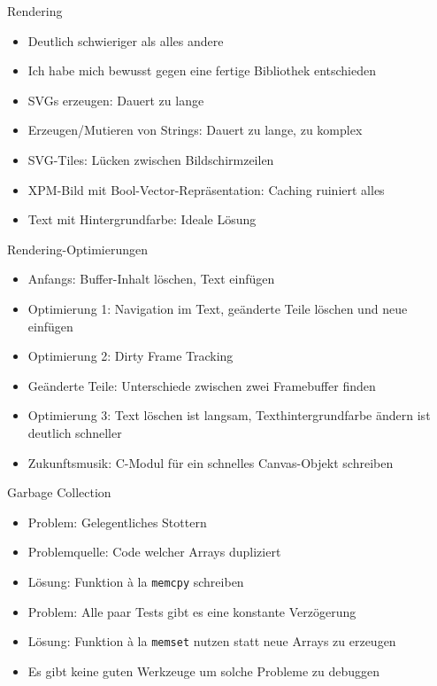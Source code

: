 \documentclass[presentation]{beamer}
\begin{document}
\begin{frame}[label={sec:org3d595c6}]{Rendering}
\begin{itemize}
\item Deutlich schwieriger als alles andere
\item Ich habe mich bewusst gegen eine fertige Bibliothek entschieden
\item SVGs erzeugen: Dauert zu lange
\item Erzeugen/Mutieren von Strings: Dauert zu lange, zu komplex
\item SVG-Tiles: Lücken zwischen Bildschirmzeilen
\item XPM-Bild mit Bool-Vector-Repräsentation: Caching ruiniert alles
\item Text mit Hintergrundfarbe: Ideale Lösung
\end{itemize}
\end{frame}

\begin{frame}[label={sec:org811aba7}]{Rendering-Optimierungen}
\begin{itemize}
\item Anfangs: Buffer-Inhalt löschen, Text einfügen
\item Optimierung 1: Navigation im Text, geänderte Teile löschen und neue
einfügen
\item Optimierung 2: Dirty Frame Tracking
\item Geänderte Teile: Unterschiede zwischen zwei Framebuffer finden
\item Optimierung 3: Text löschen ist langsam, Texthintergrundfarbe ändern
ist deutlich schneller
\item Zukunftsmusik: C-Modul für ein schnelles Canvas-Objekt schreiben
\end{itemize}
\end{frame}

\begin{frame}[fragile,label={sec:org2120f20}]{Garbage Collection}
 \begin{itemize}
\item Problem: Gelegentliches Stottern
\item Problemquelle: Code welcher Arrays dupliziert
\item Lösung: Funktion à la \texttt{memcpy} schreiben
\item Problem: Alle paar Tests gibt es eine konstante Verzögerung
\item Lösung: Funktion à la \texttt{memset} nutzen statt neue Arrays zu erzeugen
\item Es gibt keine guten Werkzeuge um solche Probleme zu debuggen
\end{itemize}
\end{frame}
\end{document}
